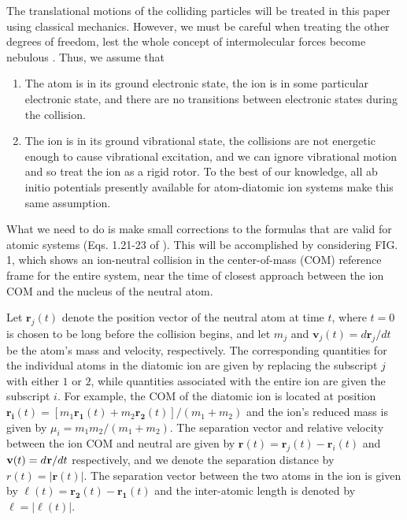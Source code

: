 \documentclass[article]{revtex4-2}
\begin{document}
The translational motions of the colliding particles will be treated in this paper using classical mechanics. However, we must be careful when treating the other degrees of freedom, lest the whole concept of intermolecular forces become nebulous \cite{hornig1956}. Thus, we assume that
\begin{enumerate}
    \item The atom is in its ground electronic state, the ion is in some particular electronic state, and there are no transitions between electronic states during the collision.
    \item The ion is in its ground vibrational state, the collisions are not energetic enough to cause vibrational excitation, and we can ignore vibrational motion and so treat the ion as a rigid rotor. To the best of our knowledge, all ab initio potentials presently available for atom-diatomic ion systems make this same assumption.
\end{enumerate}

What we need to do is make small corrections to the formulas that are valid for atomic systems (Eqs. 1.21-23 of \cite{Viehland2018}).  This will be accomplished by considering FIG. 1, which shows an ion-neutral collision in the center-of-mass (COM) reference frame for the entire system, near the time of closest approach between the ion COM and the nucleus of the neutral atom.

Let $\mathbf{r}_j(t)$ denote the position vector of the neutral atom at time $t$, where $t=0$ is chosen to be long before the collision begins, and let $m_j$ and $\mathbf{v}_j(t) = d\mathbf{r}_j / dt$ be the atom's mass and velocity, respectively. The corresponding quantities for the individual atoms in the diatomic ion are given by replacing the subscript $j$ with either $1$ or $2$, while quantities associated with the entire ion are given the subscript $i$. For example, the COM of the diatomic ion is located at position $\mathbf{r_i}(t) = [m_1 \mathbf{r_1}(t) + m_2 \mathbf{r_2}(t)]/(m_1+m_2)$ and the ion's reduced mass is given by $\mu_i = m_1m_2 / (m_1 + m_2)$. The separation vector and relative velocity between the ion COM and neutral are given by $\mathbf{r}(t) = \textbf{r}_j(t)-\textbf{r}_i(t)$ and $\mathbf{v}(t)= d\mkern1mu\mathbf{r}/dt$ respectively, and we denote the separation distance by $r(t)= |\mathbf{r}(t)|$. The separation vector between the two atoms in the ion is given by $\boldsymbol{\ell}(t)=\mathbf{r_2}(t) - \mathbf{r_1}(t)$ and the inter-atomic length is denoted by $\ell = |\boldsymbol{\ell}(t)|$.
\end{document}
